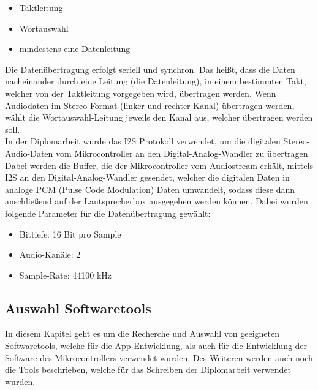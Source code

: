 \documentclass[11pt, twoside]{article}
\begin{document}
\begin{itemize}
	\item Taktleitung
	\item Wortauswahl
	\item mindestens eine Datenleitung
\end{itemize}
Die Datenübertragung erfolgt seriell und synchron. Das heißt, dass die Daten nacheinander durch eine Leitung (die Datenleitung), in einem bestimmten Takt, welcher von der Taktleitung vorgegeben wird, übertragen werden. Wenn Audiodaten im Stereo-Format (linker und rechter Kanal) übertragen werden, wählt die Wortauswahl-Leitung jeweils den Kanal aus, welcher übertragen werden soll. \parencite[vgl.][]{noauthor_urlpi12_nodate} \\
In der Diplomarbeit wurde das I2S Protokoll verwendet, um die digitalen Stereo-Audio-Daten vom Mikrocontroller an den Digital-Analog-Wandler zu übertragen. Dabei werden die Buffer, die der Mikrocontroller vom Audiostream erhält, mittels I2S an den Digital-Analog-Wandler gesendet, welcher die digitalen Daten in analoge PCM (Pulse Code Modulation) Daten umwandelt, sodass diese dann anschließend auf der Lautsprecherbox ausgegeben werden können. Dabei wurden folgende Parameter für die Datenübertragung gewählt:
\begin{itemize}
	\item Bittiefe: 16 Bit pro Sample
	\item Audio-Kanäle: 2
	\item Sample-Rate: 44100 kHz
\end{itemize}
\subsection{Auswahl Softwaretools}
In diesem Kapitel geht es um die Recherche und Auswahl von geeigneten Softwaretools, welche für die App-Entwicklung, als auch für die Entwicklung der Software des Mikrocontrollers verwendet wurden. Des Weiteren werden auch noch die Tools beschrieben, welche für das Schreiben der Diplomarbeit verwendet wurden.
\end{document}
